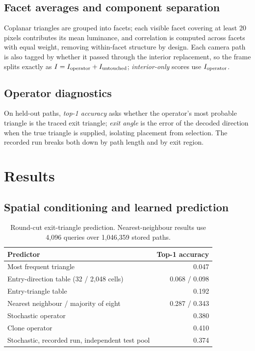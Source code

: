 \documentclass[conference]{IEEEtran}
\begin{document}
\subsection{Facet averages and component separation}
\label{sec:facets}
Coplanar triangles are grouped into facets; each visible facet covering at
least 20 pixels contributes its mean luminance, and correlation is computed
across facets with equal weight, removing within-facet structure by design.
Each camera path is also tagged by whether it passed through the interior
replacement, so the frame splits exactly as $I=I_{\rm operator}+I_{\rm
untouched}$; \emph{interior-only} scores use $I_{\rm operator}$.

\subsection{Operator diagnostics}
On held-out paths, \emph{top-1 accuracy} asks whether the operator's most
probable triangle is the traced exit triangle; \emph{exit angle} is the error of
the decoded direction when the true triangle is supplied, isolating placement
from selection. The recorded run breaks both down by path length and by exit
region.

\section{Results}
\label{sec:results}
\subsection{Spatial conditioning and learned prediction}
\begin{table}[t]
\caption{Round-cut exit-triangle prediction. Nearest-neighbour results use
4,096 queries over 1,046,359 stored paths.}
\label{tab:baselines}
\centering\small
\begin{tabular}{@{}lr@{}}
\toprule
Predictor & Top-1 accuracy \\
\midrule
Most frequent triangle & 0.047 \\
Entry-direction table (32 / 2,048 cells) & 0.068 / 0.098 \\
Entry-triangle table & 0.192 \\
Nearest neighbour / majority of eight & 0.287 / 0.343 \\
Stochastic operator & 0.380 \\
Clone operator & 0.410 \\
Stochastic, recorded run, independent test pool & 0.374 \\
\bottomrule
\end{tabular}
\end{table}
\end{document}
